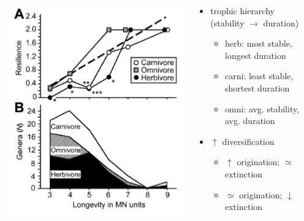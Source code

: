 \documentclass{beamer}
\begin{document}
\begin{frame}
\begin{columns}
\begin{column}{0.5\textwidth}
\begin{center}
        \includegraphics[height=0.4\textheight,width=\textwidth,keepaspectratio=true]{figure/jernvall}

        \tiny{}
      \end{center}
    \end{column}
    \begin{column}{0.5\textwidth}
      \begin{itemize}
        \item trophic hierarchy \\(stability \(\to\) duration)
          \begin{itemize}
            \item herb: most stable, \\longest duration
            \item carni: least stable, \\shortest duration
            \item omni: avg. stability, \\avg. duration
          \end{itemize}
        \item \(\uparrow\) diversification
          \begin{itemize}
            \item \(\uparrow\) origination; \(\simeq\) extinction
            \item \(\simeq\) origination; \(\downarrow\) extinction
          \end{itemize}
      \end{itemize}
    \end{column}
  \end{columns}
\end{frame}
\end{document}
